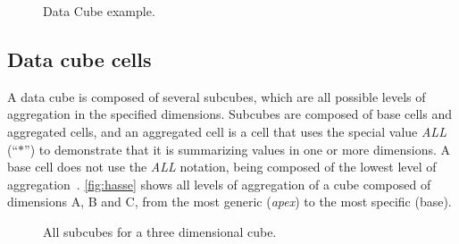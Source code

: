 \begin{figure}[!htb]
  \caption{Data Cube example.}\label{fig:cubeexample}
  \vspace{2mm}
  \begin{center}
  \end{center}
  \vspace{1mm}
  \legenda{}
\end{figure}

\subsection{Data cube cells}\label{ch:fun:cube:cells}

A data cube is composed of several subcubes, which are all possible levels of aggregation in the specified dimensions.
Subcubes are composed of base cells and aggregated cells, and an aggregated cell is a cell that uses the special value \textit{ALL} (``$*$'') to demonstrate that it is summarizing values in one or more dimensions.
A base cell does not use the \textit{ALL} notation, being composed of the lowest level of aggregation~\cite{limaSEQUENTIALPARALLELAPPROACHES2009}.
\autoref{fig:hasse} shows all levels of aggregation of a cube composed of dimensions A, B and C, from the most generic (\textit{apex}) to the most specific (base).

\begin{figure}[!htb]
  \caption{All subcubes for a three dimensional cube.}\label{fig:hasse}
  \vspace{2mm}
  \begin{center}
  \end{center}
  \vspace{1mm}
\end{figure}

